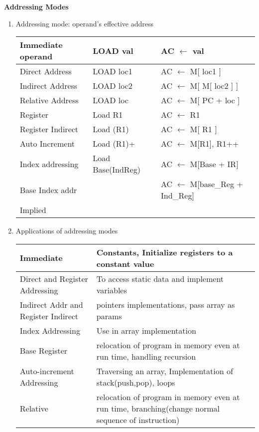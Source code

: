 
\centerline{\textbf{ \LARGE Addressing Modes}}

\begin{enumerate}
    \item Addressing mode: operand’s effective address \\
     \begin{myTableStyle} \begin{tabular}{ |m{3.2cm}|m{4cm}|m{5cm}| } \hline
      Immediate operand & LOAD val          & AC \(\leftarrow\) val   \\ \hline
      Direct Address    & LOAD loc1         & AC \(\leftarrow\) M[ loc1 ]  \\ \hline
      Indirect Address  & LOAD loc2         & AC \(\leftarrow\) M[ M[ loc2 ] ]   \\ \hline
      Relative Address  & LOAD loc          & AC \(\leftarrow\) M[ PC + loc ]  \\ \hline
      Register          & Load R1           & AC \(\leftarrow\) R1  \\ \hline
      Register Indirect & Load (R1)         & AC \(\leftarrow\) M[ R1 ]  \\ \hline
      Auto Increment    & Load (R1)+        & AC \(\leftarrow\) M[R1],  R1++  \\ \hline
      Index addressing  & Load Base(IndReg) & AC \(\leftarrow\) M[Base + IR]\\ \hline
      Base Index addr   &                   & AC \(\leftarrow\) M[base\_Reg + Ind\_Reg]\\ \hline
      Implied & & \\ \hline
      \end{tabular} \end{myTableStyle} \vspace{0.08in}

    \item Applications of addressing modes\\
     \begin{myTableStyle} \begin{tabular}{ |m{5.5cm}|m{10.5cm}| } \hline
      Immediate & Constants, Initialize registers to a constant value  \\ \hline
      Direct and Register Addressing &  To access static data and implement variables \\ \hline
      Indirect Addr and Register Indirect & pointers implementations, pass array as params \\ \hline
      Index Addressing & Use in array implementation \\ \hline
      Base Register  & relocation of program in memory even at run time, handling recursion \\ \hline
      Auto-increment Addressing & Traversing an array, Implementation of stack(push,pop), loops \\ \hline
      Relative & relocation of program in memory even at run time, branching(change normal sequence of instruction) \\ \hline
      \end{tabular} \end{myTableStyle} \vspace{0.08in}



\end{enumerate}
